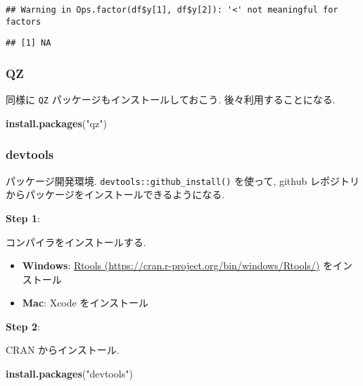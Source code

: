 \documentclass[a4paper]{scrbook}
\newenvironment{Shaded}{\begin{snugshade}}{\end{snugshade}}
\newcommand{\KeywordTok}[1]{\textcolor[rgb]{0.13,0.29,0.53}{\textbf{{#1}}}}
\newcommand{\StringTok}[1]{\textcolor[rgb]{0.31,0.60,0.02}{{#1}}}
\newcommand{\NormalTok}[1]{{#1}}
\providecommand{\tightlist}{%
  \setlength{\itemsep}{0pt}\setlength{\parskip}{0pt}}
\theoremstyle{definition}
\begin{document}
\begin{verbatim}
## Warning in Ops.factor(df$y[1], df$y[2]): '<' not meaningful for factors
\end{verbatim}

\begin{verbatim}
## [1] NA
\end{verbatim}

\subsubsection*{QZ}\label{qz}

同様に \texttt{QZ} パッケージもインストールしておこう.
後々利用することになる.

\begin{Shaded}
\begin{Highlighting}[]
\KeywordTok{install.packages}\NormalTok{(}\StringTok{"qz"}\NormalTok{)}
\end{Highlighting}
\end{Shaded}

\subsubsection*{devtools}\label{devtools}

パッケージ開発環境. \texttt{devtools::github\_install()} を使って,
github レポジトリからパッケージをインストールできるようになる.

\textbf{Step 1}:

コンパイラをインストールする.

\begin{itemize}
\tightlist
\item
  \textbf{Windows}:
  \href{https://cran.r-project.org/bin/windows/Rtools/}{Rtools
  (https://cran.r-project.org/bin/windows/Rtools/)} をインストール
\item
  \textbf{Mac}: Xcode をインストール
\end{itemize}

\textbf{Step 2}:

CRAN からインストール.

\begin{Shaded}
\begin{Highlighting}[]
\KeywordTok{install.packages}\NormalTok{(}\StringTok{"devtools"}\NormalTok{)}
\end{Highlighting}
\end{Shaded}
\end{document}
